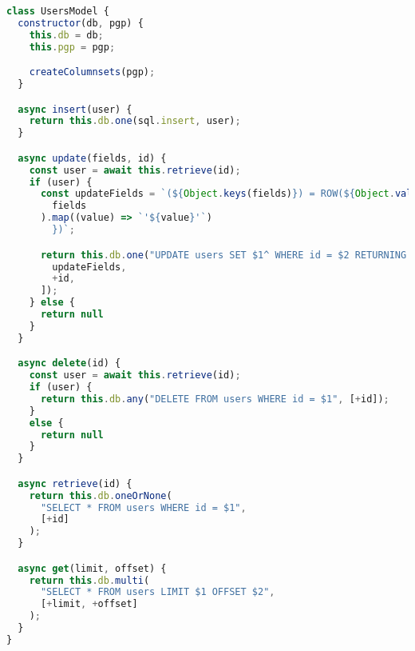 \begin{lstlisting}[language=JavaScript,caption={Express.js user model},breaklines=true,label={lst:expressModel}]
class UsersModel {
  constructor(db, pgp) {
    this.db = db;
    this.pgp = pgp;

    createColumnsets(pgp);
  }

  async insert(user) {
    return this.db.one(sql.insert, user);
  }

  async update(fields, id) {
    const user = await this.retrieve(id);
    if (user) {
      const updateFields = `(${Object.keys(fields)}) = ROW(${Object.values(
        fields
      ).map((value) => `'${value}'`)
        })`;

      return this.db.one("UPDATE users SET $1^ WHERE id = $2 RETURNING *", [
        updateFields,
        +id,
      ]);
    } else {
      return null
    }
  }

  async delete(id) {
    const user = await this.retrieve(id);
    if (user) {
      return this.db.any("DELETE FROM users WHERE id = $1", [+id]);
    }
    else {
      return null
    }
  }

  async retrieve(id) {
    return this.db.oneOrNone(
      "SELECT * FROM users WHERE id = $1",
      [+id]
    );
  }

  async get(limit, offset) {
    return this.db.multi(
      "SELECT * FROM users LIMIT $1 OFFSET $2",
      [+limit, +offset]
    );
  }
}
\end{lstlisting}
